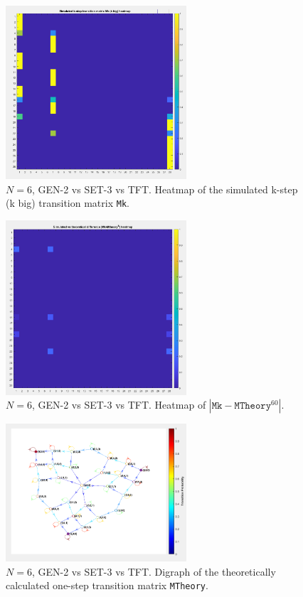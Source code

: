 \documentclass[12pt]{report}
\begin{document}
\begin{figure}[h!]
    \centering
    \includegraphics[width=0.6\textwidth]{A5-MsimkHeatmap.png}
    \caption{$N=6$, GEN-2 vs SET-3 vs TFT. Heatmap of the simulated k-step (k big) transition matrix \texttt{Mk}.}
    \label{A5}
\end{figure}





\begin{figure}[h!]
    \centering
    \includegraphics[width=0.6\textwidth]{A6-MTheoryk-MsimkHeatmap.png}
    \caption{$N=6$, GEN-2 vs SET-3 vs TFT. Heatmap of $|\texttt{Mk}-\texttt{MTheory}^{60}|$.}
    \label{A6}
\end{figure}

\begin{figure}[h!]
    \centering
    \includegraphics[width=0.6\textwidth]{A7-MTheoryDigraph.png}
    \caption{$N=6$, GEN-2 vs SET-3 vs TFT. Digraph of the theoretically calculated one-step transition matrix \texttt{MTheory}.}
    \label{A7}
\end{figure}
\end{document}
